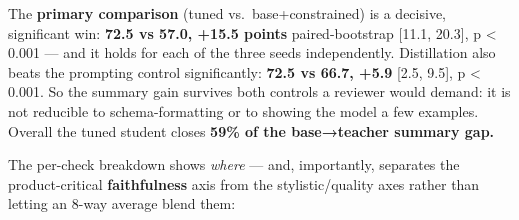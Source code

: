 \documentclass[11pt]{article}
\begin{document}
The \textbf{primary comparison} (tuned vs.~base+constrained) is a
decisive, significant win: \textbf{72.5 vs 57.0, +15.5 points}
paired-bootstrap {[}11.1, 20.3{]}, p \textless{} 0.001 --- and it holds
for each of the three seeds independently. Distillation also beats the
prompting control significantly: \textbf{72.5 vs 66.7, +5.9} {[}2.5,
9.5{]}, p \textless{} 0.001. So the summary gain survives both controls
a reviewer would demand: it is not reducible to schema-formatting or to
showing the model a few examples. Overall the tuned student closes
\textbf{59\% of the base→teacher summary gap.}

The per-check breakdown shows \emph{where} --- and, importantly,
separates the product-critical \textbf{faithfulness} axis from the
stylistic/quality axes rather than letting an 8-way average blend them:
\end{document}
